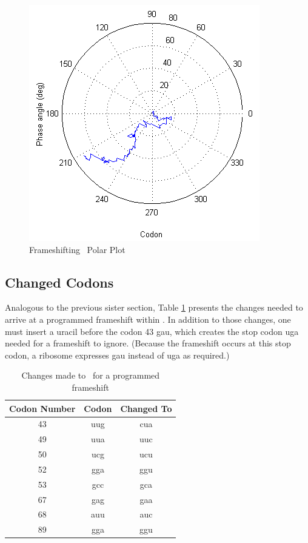 \documentclass[10pt,twocolumn]{article}
\begin{document}
\begin{figure}[htp]
    \centering
    \caption{Frameshifting \rpoS\ Polar Plot}
    \label{rposfs:polar}
    \includegraphics[scale=0.7]{rpoS/frameshift-polar.png}
\end{figure}

\subsection{Changed Codons}
Analogous to the previous sister section, Table \ref{rposfs:changes} presents the
changes needed to arrive at a programmed frameshift within \rpoS. In addition to
those changes, one must insert a uracil before the codon 43 gau, which creates
the stop codon uga needed for a frameshift to ignore. (Because the frameshift
occurs at this stop codon, a ribosome expresses gau instead of uga as required.)

\begin{table}
\caption{Changes made to \rpoS\ for a programmed frameshift}
\label{rposfs:changes}
\begin{tabular}{ccc}
  \toprule
  Codon Number & Codon & Changed To\\
  \midrule
  43 & uug & cua\\
  49 & uua & uuc\\
  50 & ucg & ucu\\
  52 & gga & ggu\\
  53 & gcc & gca\\
  67 & gag & gaa\\
  68 & auu & auc\\
  89 & gga & ggu\\
  \bottomrule
\end{tabular}
\end{table}


\end{document}
